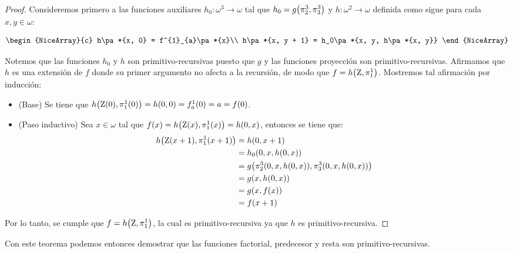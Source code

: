 \begin{proof}
	Consideremos primero a las funciones auxiliares $h_0:\omega^3\to\omega$ tal que $h_0 = g\pa*{\PROYECCION{3}{2},\PROYECCION{3}{3}}$ y $h:\omega^{2}\to\omega$ definida como sigue para cada $x, y\in\omega$:

	\[
		\begin{NiceArray}{c}
			h\pa*{x, 0} = f^{1}_{a}\pa*{x}\\
			h\pa*{x, y + 1} = h_0\pa*{x, y, h\pa*{x, y}}
		\end{NiceArray}
	\]

	Notemos que las funciones $h_0$ y $h$ son primitivo-recursivas puesto que $g$ y las funciones proyección son primitivo-recursivas. Afirmamos que $h$ es una extensión de $f$ donde su primer argumento no afecta a la recursión, de modo que $f = h\pa*{\CERO,\PROYECCION{1}{1}}$. Mostremos tal afirmación por inducción:

	\begin{itemize}
		\item (Base) Se tiene que $h\pa*{\CERO\pa*{0},\PROYECCION{1}{1}\pa*{0}} = h\pa*{0, 0} = f_{a}^{1}\pa*{0} = a = f\pa*{0}$.
		\item (Paso inductivo) Sea $x\in\omega$ tal que $f\pa*{x} = h\pa*{\CERO\pa*{x},\PROYECCION{1}{1}\pa*{x}} = h\pa*{0, x}$, entonces se tiene que:
		\begin{align*}
			h\pa*{\CERO\pa*{x + 1},\PROYECCION{1}{1}\pa*{x + 1}} &= h\pa*{0, x + 1}\\
			&= h_{0}\pa*{0, x, h\pa*{0, x}}\\
			&= g\pa*{\PROYECCION{3}{2}\pa*{0, x, h\pa*{0, x}},\PROYECCION{3}{3}\pa*{0, x, h\pa*{0, x}}}\\
			&= g\pa*{x, h\pa*{0, x}}\\
			&= g\pa*{x, f\pa*{x}}\\
			&= f\pa*{x + 1}
		\end{align*}
	\end{itemize}

	Por lo tanto, se cumple que $f = h\pa*{\CERO,\PROYECCION{1}{1}}$, la cual es primitivo-recursiva ya que $h$ es primitivo-recursiva.
\end{proof}

Con este teorema podemos entonces demostrar que las funciones factorial, predecesor y resta son primitivo-recursivas.


